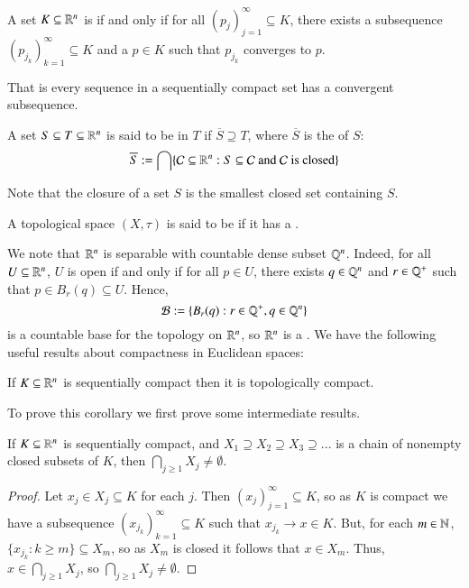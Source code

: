 \begin{defn}
    A set $K \subseteq \mathbb R^n$ is  if and only if for all $(p_j)_{j=1}^{\infty} \subseteq K$, there exists a subsequence $(p_{j_k})_{k=1}^{\infty} \subseteq K$ and a $p \in K$ such that $p_{j_k}$ converges to $p$.
\end{defn}

That is every sequence in a sequentially compact set has a convergent subsequence.

\begin{defn}
    A set $S \subseteq T\subseteq \mathbb R^n$ is said to be  in $T$ if $\overline{S} \supseteq T$, where $\overline{S}$ is the  of $S$: \begin{equation*}
        \overline{S} := \bigcap\{\mathcal{C}\subseteq \mathbb R^n:S\subseteq \mathcal{C}\text{ and }\mathcal{C}\text{ is closed}\}
    \end{equation*}
\end{defn}

Note that the closure of a set $S$ is the smallest closed set containing $S$.

\begin{defn}
    A topological space $(X,\tau)$ is said to be  if it has a .
\end{defn}

We note that $\mathbb R^n$ is separable with countable dense subset $\mathbb Q^n$. Indeed, for all $U \subseteq \mathbb R^n$, $U$ is open if and only if for all $p \in U$, there exists $q \in \mathbb Q^n$ and $r \in \mathbb Q^+$ such that $p \in B_r(q) \subseteq U$. Hence, \begin{equation*}
    \mathcal{B} := \{B_r(q):r\in \mathbb Q^+,q \in \mathbb Q^n\}
\end{equation*}
is a countable base for the topology on $\mathbb R^n$, so $\mathbb R^n$ is a . We have the following useful results about compactness in Euclidean spaces:

\begin{cor}
    If $K\subseteq \mathbb R^n$ is sequentially compact then it is topologically compact.
\end{cor}

To prove this corollary we first prove some intermediate results.

\begin{prop}
    If $K \subseteq \mathbb R^n$ is sequentially compact, and $X_1 \supseteq X_2\supseteq X_3\supseteq ...$ is a chain of nonempty closed subsets of $K$, then $\bigcap_{j\geq 1}X_j \neq \emptyset$.
\end{prop}
\begin{proof}
    Let $x_j \in X_j \subseteq K$ for each $j$. Then $(x_j)_{j=1}^{\infty} \subseteq K$, so as $K$ is compact we have a subsequence $(x_{j_k})_{k=1}^{\infty} \subseteq K$ such that $x_{j_k}\rightarrow x \in K$. But, for each $m \in \mathbb N$, $\{x_{j_k}:k \geq m\} \subseteq X_m$, so as $X_m$ is closed it follows that $x \in X_m$. Thus, $x \in \bigcap_{j\geq 1}X_j$, so $\bigcap_{j\geq 1}X_j \neq \emptyset$.
\end{proof}


